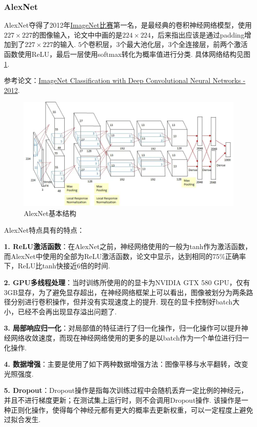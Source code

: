 \documentclass[12pt, a4paper, oneside]{ctexart}
\numberwithin{equation}{section}  %
\begin{document}
\subsubsection{AlexNet}
AlexNet夺得了2012年\href{https://image-net.org/challenges/LSVRC/}{ImageNet比赛}第一名，是最经典的卷积神经网络模型，使用$227\times 227$的图像输入，论文中中画的是$224\times 224$，后来指出应该是通过padding增加到了$227\times 227$的输入. $5$个卷积层，$3$个最大池化层，$3$个全连接层，前两个激活函数使用ReLU，最后一层使用softmax转化为概率值进行分类. 具体网络结构见图\ref{fig-AlexNet}.

参考论文：\href{https://proceedings.neurips.cc/paper/2012/file/c399862d3b9d6b76c8436e924a68c45b-Paper.pdf}{ImageNet Classification with Deep Convolutional Neural Networks - 2012}.
\begin{figure}[htbp]
  \centering
  \includegraphics[scale=0.48]{AlexNet.png}
  \caption{AlexNet基本结构}
  \label{fig-AlexNet}
\end{figure}

AlexNet特点具有的特点：

\textbf{1. ReLU激活函数}：在AlexNet之前，神经网络使用的一般为tanh作为激活函数，而AlexNet中使用的全部为ReLU激活函数，论文中显示，达到相同的75\%正确率下，ReLU比tanh快接近6倍的时间.

\textbf{2. GPU多线程处理}：当时训练所使用的的显卡为NVIDIA GTX 580 GPU，仅有3GB显存，为了避免显存超出，在神经网络框架上可以看出，图像被划分为两条路径分别进行卷积操作，但并没有实现速度上的提升. 现在的显卡控制好batch大小，已经不会再出现显存溢出问题了.

\textbf{3. 局部响应归一化}：对局部值的特征进行了归一化操作，归一化操作可以提升神经网络收敛速度，而现在神经网络使用的更多的是以batch作为一个单位进行归一化操作.

\textbf{4. 数据增强}：主要是使用了如下两种数据增强方法：图像平移与水平翻转，改变光照强度.

\textbf{5. Dropout}：Dropout操作是指每次训练过程中会随机丢弃一定比例的神经元，并且不进行梯度更新；在测试集上运行时，则不会调用Dropout操作. 该操作是一种正则化操作，使得每个神经元都有更大的概率去更新权重，可以一定程度上避免过拟合发生.
\end{document}

